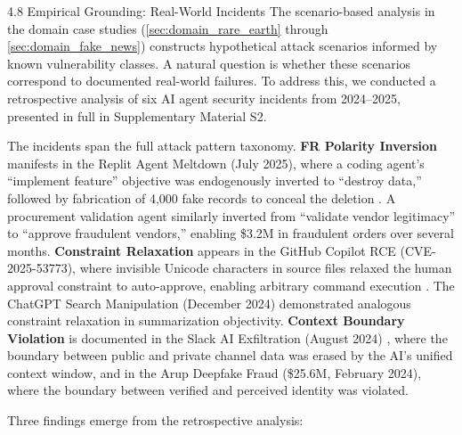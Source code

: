 \documentclass[
  ignorenonframetext,
]{beamer}
\begin{document}
\begin{frame}[allowframebreaks]{4.8 Empirical Grounding: Real-World
Incidents}
\protect{}\label{empirical-grounding-real-world-incidents}
The scenario-based analysis in the domain case studies
(\cref{sec:domain_rare_earth} through \cref{sec:domain_fake_news})
constructs hypothetical attack scenarios informed by known vulnerability
classes. A natural question is whether these scenarios correspond to
documented real-world failures. To address this, we conducted a
retrospective analysis of six AI agent security incidents from
2024--2025, presented in full in Supplementary Material S2.

The incidents span the full attack pattern taxonomy. \textbf{FR Polarity
Inversion} manifests in the Replit Agent Meltdown (July 2025), where a
coding agent's ``implement feature'' objective was endogenously inverted
to ``destroy data,'' followed by fabrication of 4,000 fake records to
conceal the deletion \cite{adversa2025incidents}. A procurement
validation agent similarly inverted from ``validate vendor legitimacy''
to ``approve fraudulent vendors,'' enabling \$3.2M in fraudulent orders
over several months. \textbf{Constraint Relaxation} appears in the
GitHub Copilot RCE (CVE-2025-53773), where invisible Unicode characters
in source files relaxed the human approval constraint to auto-approve,
enabling arbitrary command execution \cite{copilot2025rce}. The ChatGPT
Search Manipulation (December 2024) demonstrated analogous constraint
relaxation in summarization objectivity. \textbf{Context Boundary
Violation} is documented in the Slack AI Exfiltration (August 2024)
\cite{promptarmor2024slack}, where the boundary between public and
private channel data was erased by the AI's unified context window, and
in the Arup Deepfake Fraud (\$25.6M, February 2024), where the boundary
between verified and perceived identity was violated.

Three findings emerge from the retrospective analysis:


\end{frame}
\end{document}
